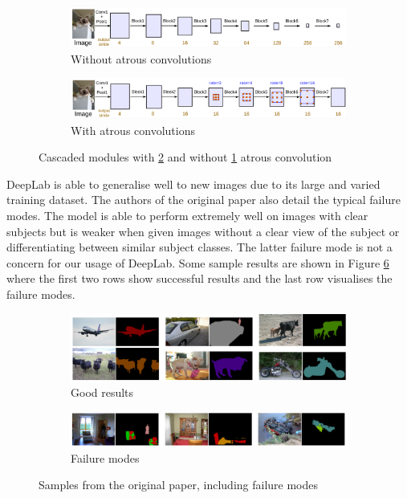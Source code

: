 \documentclass{article}
\begin{document}
\begin{figure}[h!]
  \centering
  \begin{subfigure}{\textwidth}
    \includegraphics[width=\textwidth]{images/deeplabnoatrous.png}
    \caption{Without atrous convolutions}
    \label{deeplabnoatrous}
  \end{subfigure}
  \begin{subfigure}{\textwidth}
    \includegraphics[width=\textwidth]{images/deeplabatrous.png}
    \caption{With atrous convolutions}
    \label{deeplabatrous}
  \end{subfigure}
  \caption{Cascaded modules with \ref{deeplabatrous} and without \ref{deeplabnoatrous} atrous convolution}
  \label{deeplabatrousnoatrous}
\end{figure}

DeepLab is able to generalise well to new images due to its large and varied training dataset. The authors of the original paper also detail the typical failure modes. The model is able to perform extremely well on images with clear subjects but is weaker when given images without a clear view of the subject or differentiating between similar subject classes. The latter failure mode is not a concern for our usage of DeepLab. Some sample results are shown in Figure \ref{deeplabresults} where the first two rows show successful results and the last row visualises the failure modes.

\begin{figure}[h!]
  \centering
  \begin{subfigure}{\textwidth}
    \includegraphics[width=\textwidth]{images/deeplabresultsgood.png}
    \caption{Good results}
    \label{deeplabresultsgood}
  \end{subfigure}
  \begin{subfigure}{\textwidth}
    \includegraphics[width=\textwidth]{images/deeplabresultsbad.png}
    \caption{Failure modes}
    \label{deeplabresultsbad}
  \end{subfigure}
  \caption{Samples from the original paper, including failure modes}
  \label{deeplabresults}
\end{figure}
\end{document}
